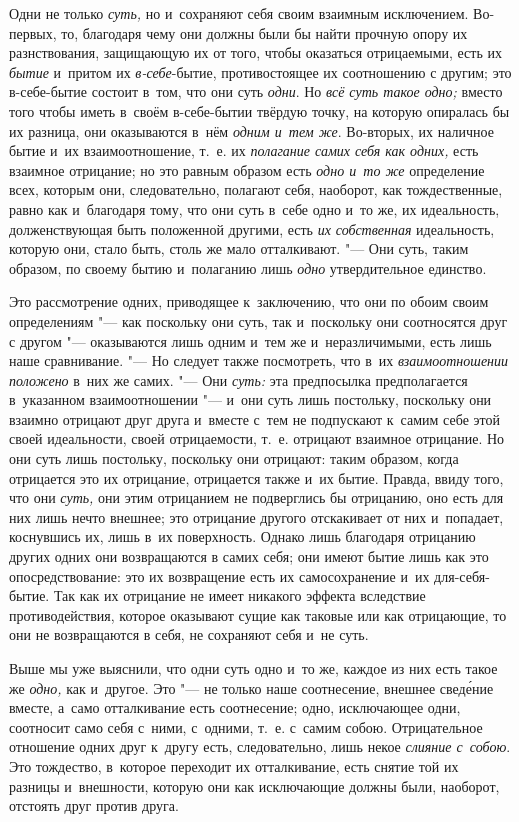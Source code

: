 Одни не только {\em суть,} но и~сохраняют себя своим взаимным исключением.
Во-первых, то, благодаря чему они должны были бы найти прочную опору их
разнствования, защищающую их от того, чтобы оказаться отрицаемыми, есть их
{\em бытие} и~притом их {\em в-себе}-бытие, противостоящее их соотношению с
другим; это в-себе-бытие состоит в~том, что они суть {\em одни}. Но
{\em всё суть такое одно;} вместо того чтобы иметь в~своём в-себе-бытии твёрдую
точку, на которую опиралась бы их разница, они оказываются в~нём
{\em одним и~тем же}. Во-вторых, их наличное бытие и~их взаимоотношение, т.~е.
их {\em полагание самих себя как одних,} есть взаимное отрицание; но это равным
образом есть {\em одно и~то же} определение всех, которым они, следовательно,
полагают себя, наоборот, как тождественные, равно как и~благодаря тому, что они
суть в~себе одно и~то же, их идеальность, долженствующая быть положенной
другими, есть {\em их собственная} идеальность, которую они, стало быть, столь
же мало отталкивают. "--- Они суть, таким образом, по своему бытию и~полаганию
лишь {\em одно} утвердительное единство.

Это рассмотрение одних, приводящее к~заключению, что они по обоим своим
определениям "--- как поскольку они суть, так и~поскольку они соотносятся друг
с другом "--- оказываются лишь одним и~тем же и~неразличимыми, есть лишь наше
сравнивание. "--- Но следует также посмотреть, что в~их
{\em взаимоотношении положено} в~них же самих. "--- Они
{\em суть:} эта предпосылка предполагается в~указанном
взаимоотношении "--- и~они суть лишь постольку, поскольку они взаимно отрицают
друг друга и~вместе с~тем не подпускают к~самим себе этой своей
идеальности, своей отрицаемости, т.~е. отрицают взаимное отрицание. Но они
суть лишь постольку, поскольку они отрицают: таким образом, когда
отрицается это их отрицание, отрицается также и~их бытие. Правда, ввиду
того, что они {\em суть,} они этим отрицанием не
подверглись бы отрицанию, оно есть для них лишь нечто внешнее; это
отрицание другого отскакивает от них и~попадает, коснувшись их, лишь в~их
поверхность. Однако лишь благодаря отрицанию других одних они возвращаются
в самих себя; они имеют бытие лишь как это опосредствование: это их
возвращение есть их самосохранение и~их для-себя-бытие. Так как их
отрицание не имеет никакого эффекта вследствие противодействия, которое
оказывают сущие как таковые или как отрицающие, то они не возвращаются в
себя, не сохраняют себя и~не суть.

Выше мы уже выяснили, что одни суть одно и~то же, каждое из них есть такое
же {\em одно,} как и~другое. Это "--- не только наше
соотнесение, внешнее свед\'{е}ние вместе, а~само отталкивание есть соотнесение;
одно, исключающее одни, соотносит само себя с~ними, с~одними, т.~е. с~самим
собою. Отрицательное отношение одних друг к~другу есть, следовательно, лишь
некое {\em слияние с~собою}. Это тождество, в~которое
переходит их отталкивание, есть снятие той их разницы и~внешности, которую
они как исключающие должны были, наоборот, отстоять друг против друга.

